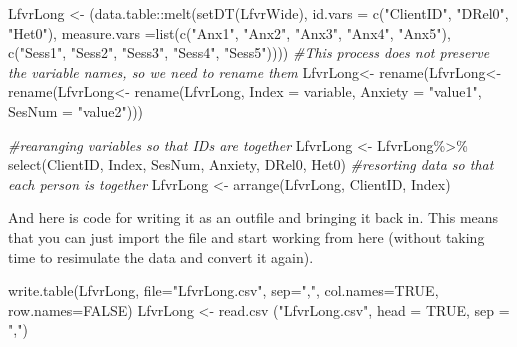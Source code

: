 \documentclass[
  english,
]{book}
\newenvironment{Shaded}{\begin{snugshade}}{\end{snugshade}}
\newcommand{\AttributeTok}[1]{\textcolor[rgb]{0.77,0.63,0.00}{#1}}
\newcommand{\CommentTok}[1]{\textcolor[rgb]{0.56,0.35,0.01}{\textit{#1}}}
\newcommand{\ConstantTok}[1]{\textcolor[rgb]{0.00,0.00,0.00}{#1}}
\newcommand{\FunctionTok}[1]{\textcolor[rgb]{0.00,0.00,0.00}{#1}}
\newcommand{\NormalTok}[1]{#1}
\newcommand{\OtherTok}[1]{\textcolor[rgb]{0.56,0.35,0.01}{#1}}
\newcommand{\SpecialCharTok}[1]{\textcolor[rgb]{0.00,0.00,0.00}{#1}}
\newcommand{\StringTok}[1]{\textcolor[rgb]{0.31,0.60,0.02}{#1}}
\begin{document}
\begin{Shaded}
\begin{Highlighting}[]
\NormalTok{LfvrLong }\OtherTok{\textless{}{-}}\NormalTok{ (data.table}\SpecialCharTok{::}\FunctionTok{melt}\NormalTok{(}\FunctionTok{setDT}\NormalTok{(LfvrWide), }\AttributeTok{id.vars =} \FunctionTok{c}\NormalTok{(}\StringTok{"ClientID"}\NormalTok{, }\StringTok{"DRel0"}\NormalTok{, }\StringTok{"Het0"}\NormalTok{), }\AttributeTok{measure.vars =}\FunctionTok{list}\NormalTok{(}\FunctionTok{c}\NormalTok{(}\StringTok{"Anx1"}\NormalTok{, }\StringTok{"Anx2"}\NormalTok{, }\StringTok{"Anx3"}\NormalTok{, }\StringTok{"Anx4"}\NormalTok{, }\StringTok{"Anx5"}\NormalTok{), }\FunctionTok{c}\NormalTok{(}\StringTok{"Sess1"}\NormalTok{, }\StringTok{"Sess2"}\NormalTok{, }\StringTok{"Sess3"}\NormalTok{, }\StringTok{"Sess4"}\NormalTok{, }\StringTok{"Sess5"}\NormalTok{))))}
\CommentTok{\#This process  does not preserve the variable names, so we need to rename them}
\NormalTok{LfvrLong}\OtherTok{\textless{}{-}}  \FunctionTok{rename}\NormalTok{(LfvrLong}\OtherTok{\textless{}{-}}  \FunctionTok{rename}\NormalTok{(LfvrLong}\OtherTok{\textless{}{-}}  \FunctionTok{rename}\NormalTok{(LfvrLong, }\AttributeTok{Index =}\NormalTok{ variable, }\AttributeTok{Anxiety =} \StringTok{"value1"}\NormalTok{, }\AttributeTok{SesNum =} \StringTok{"value2"}\NormalTok{)))}

\CommentTok{\#rearanging variables so that IDs are together}
\NormalTok{LfvrLong }\OtherTok{\textless{}{-}}\NormalTok{ LfvrLong}\SpecialCharTok{\%\textgreater{}\%}
  \FunctionTok{select}\NormalTok{(ClientID, Index, SesNum, Anxiety, DRel0, Het0)}
\CommentTok{\#resorting data so that each person is together}
\NormalTok{LfvrLong }\OtherTok{\textless{}{-}} \FunctionTok{arrange}\NormalTok{(LfvrLong, ClientID, Index)}
\end{Highlighting}
\end{Shaded}

And here is code for writing it as an outfile and bringing it back in. This means that you can just import the file and start working from here (without taking time to resimulate the data and convert it again).

\begin{Shaded}
\begin{Highlighting}[]
\FunctionTok{write.table}\NormalTok{(LfvrLong, }\AttributeTok{file=}\StringTok{"LfvrLong.csv"}\NormalTok{, }\AttributeTok{sep=}\StringTok{","}\NormalTok{, }\AttributeTok{col.names=}\ConstantTok{TRUE}\NormalTok{, }\AttributeTok{row.names=}\ConstantTok{FALSE}\NormalTok{)}
\NormalTok{LfvrLong }\OtherTok{\textless{}{-}} \FunctionTok{read.csv}\NormalTok{ (}\StringTok{"LfvrLong.csv"}\NormalTok{, }\AttributeTok{head =} \ConstantTok{TRUE}\NormalTok{, }\AttributeTok{sep =} \StringTok{","}\NormalTok{)}
\end{Highlighting}
\end{Shaded}
\end{document}

